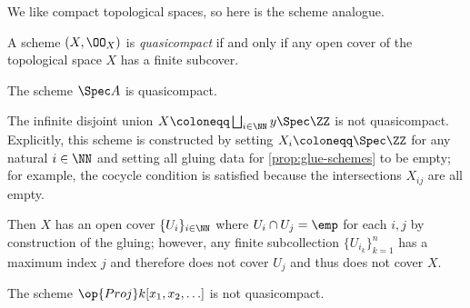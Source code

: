 \documentclass[../notes.tex]{subfiles}
\begin{document}
We like compact topological spaces, so here is the scheme analogue.
\begin{definition}[Quasicompact]
	A scheme $(X,\OO_X)$ is \textit{quasicompact} if and only if any open cover of the topological space $X$ has a finite subcover.
\end{definition}
\begin{example}
	The scheme $\Spec A$ is quasicompact.
\end{example}
\begin{nex} \label{nex:notquasicompactscheme}
	The infinite disjoint union $X\coloneqq\bigsqcup_{i\in\NN}y\Spec\ZZ$ is not quasicompact. Explicitly, this scheme is constructed by setting $X_i\coloneqq\Spec\ZZ$ for any natural $i\in\NN$ and setting all gluing data for \autoref{prop:glue-schemes} to be empty; for example, the cocycle condition is satisfied because the intersections $X_{ij}$ are all empty.
	
	Then $X$ has an open cover $\{U_i\}_{i\in\NN}$ where $U_i\cap U_j=\emp$ for each $i,j$ by construction of the gluing; however, any finite subcollection $\{U_{i_k}\}_{k=1}^n$ has a maximum index $j$ and therefore does not cover $U_j$ and thus does not cover $X$.
\end{nex}
\begin{nex}
	The scheme $\op{Proj}k[x_1,x_2,\ldots]$ is not quasicompact.
\end{nex}
\end{document}

